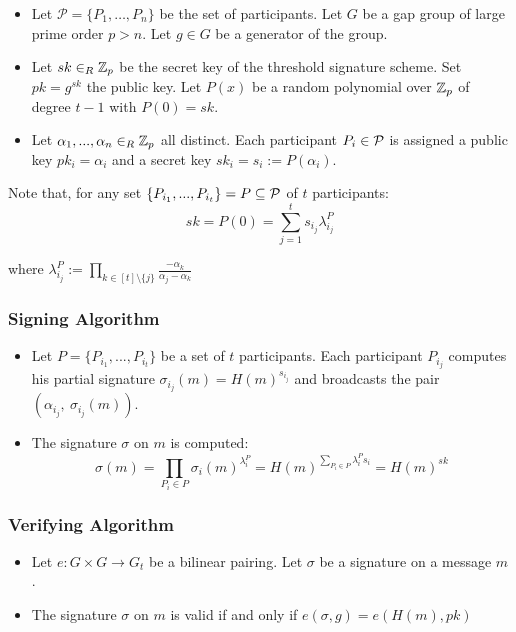 \begin{itemize}[align = left, leftmargin=*, label={--}]
\item Let $\mathcal{P}= \{ P_1, \dots , P_n \}$ be the set of participants. Let $G$ be a gap group of large prime order $p > n$. Let $g \in G$ be a generator of the group.

\item Let $sk \in_R {\mathbb Z}_p$ be the secret key of the threshold signature scheme. Set $pk = g^{sk}$ the public key. Let $P(x)$ be a random polynomial over ${\mathbb Z}_p$ of degree $t-1$ with $P(0) = sk$.

\item Let $\alpha_1, ..., \alpha_n \in_R {\mathbb Z}_p$ all distinct. Each participant $P_i \in {\mathcal P}$ is assigned a public key $pk_i = \alpha_i$ and a secret key $sk_i = s_i := P(\alpha_i)$.

\end{itemize}

Note that, for any set $\{P_{i_1}, ... , P_{i_t} \} = P \subseteq {\mathcal P}$ of $t$ participants: $$sk = P(0) = \sum_{j = 1}^t s_{i_j} \lambda_{i_j}^P$$

where $\lambda_{i_j}^P := \prod_{k \in [t] \setminus \{j\}} \frac{-\alpha_k}{\alpha_j - \alpha_k}$

\subsubsection*{Signing Algorithm}
\begin{itemize}[align = left, leftmargin=*, label={--}]

\item Let $P = \{P_{i_1}, ..., P_{i_t} \}$ be a set of $t$ participants. Each participant $P_{i_j}$ computes his partial signature $\sigma_{i_j} (m) = H(m)^{s_{i_j}}$ and broadcasts the pair $(\alpha_{i_j}, \ \sigma_{i_j} (m))$.

\item The signature $\sigma$ on $m$ is computed: $$ \sigma (m) = \prod_{P_i \in P} \sigma_i (m)^{\lambda_i^{P}}= H(m)^{\sum_{P_i \in P} \lambda_i^P s_i} = H(m)^{sk}$$
\end{itemize}

\subsubsection*{Verifying Algorithm}
\begin{itemize}[align = left, leftmargin=*, label={--}]
\item Let $e: G \times G \rightarrow G_t$ be a bilinear pairing. Let $\sigma$ be a signature on a message $m$.
\item The signature $\sigma$ on $m$ is valid if and only if $e(\sigma, g) = e(H(m), pk)$
\end{itemize}